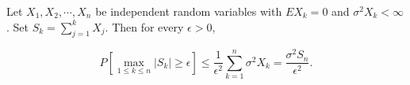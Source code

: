 Let $X_1, X_2, \cdots, X_n$ be independent random variables with $E X_k = 0$ and $\sigma^2 X_k < \infty$. Set $S_k = \sum_{j=1}^{k} X_j$. Then for every $\epsilon > 0$,

$$P\left[\max_{1 \leq k \leq n} |S_k| \geq \epsilon\right] \leq \frac{1}{\epsilon^2} \sum_{k=1}^{n} \sigma^2 X_k = \frac{\sigma^2 S_n}{\epsilon^2}.$$
